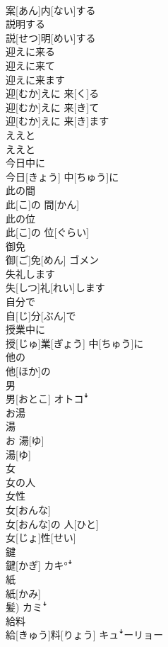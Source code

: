 \documentclass[8pt]{extreport}
\begin{document}
\begin{CJK}{UTF8}{min}
\\	案[あん]内[ない]する	
\\	説明する	
\\	説[せつ]明[めい]する	
\\	迎えに来る 
\\	迎えに来て 
\\	迎えに来ます	
\\	迎[むか]えに 来[く]る 
\\	迎[むか]えに 来[き]て 
\\	迎[むか]えに 来[き]ます	
\\	ええと	
\\	ええと	
\\	今日中に	
\\	今日[きょう] 中[ちゅう]に	
\\	此の間	
\\	此[こ]の 間[かん]	
\\	此の位	
\\	此[こ]の 位[ぐらい]	
\\	御免	
\\	御[ご]免[めん]	ゴメン
\\	失礼します	
\\	失[しつ]礼[れい]します	
\\	自分で	
\\	自[じ]分[ぶん]で	
\\	授業中に	
\\	授[じゅ]業[ぎょう] 中[ちゅう]に	
\\	他の	
\\	他[ほか]の	
\\	男	
\\	男[おとこ]	オトコꜜ
\\	お湯 
\\	湯	
\\	お 湯[ゆ] 
\\	湯[ゆ]	
\\	女 
\\	女の人 
\\	女性	
\\	女[おんな] 
\\	女[おんな]の 人[ひと] 
\\	女[じょ]性[せい]	
\\	鍵	
\\	鍵[かぎ]	カキ°ꜜ
\\	紙	
\\	紙[かみ] 
\\	髪)	カミꜜ
\\	給料	
\\	給[きゅう]料[りょう]	キュꜜーリョー

\end{CJK}
\end{document}
